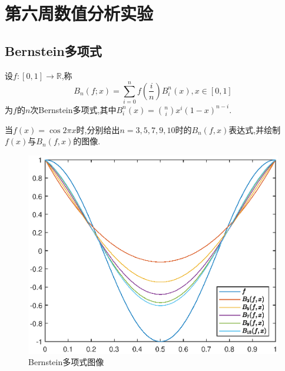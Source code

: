 \section{第六周数值分析实验}
\subsection{Bernstein多项式}
\begin{definition}
	设$f:[0,1]\to\mathbb{R}$,称
	$$
	B_n(f;x)=\sum_{i=0}^{n}f\left(\frac{i}{n}\right)B_i^n(x),x\in[0,1]
	$$
	为$f$的$n$次Bernstein多项式,其中$B_i^n(x)=\binom{n}{i}x^i(1-x)^{n-i}$.
\end{definition}

\begin{ex}
	当$f(x)=\cos 2\pi x$时,分别给出$n=3, 5, 7, 9, 10$时的$B_n(f,x)$表达式,并绘制$f(x)$与$B_n(f,x)$的图像.
\end{ex}

\begin{figure}[H]
	\centering
	\includegraphics[width = 0.6\linewidth]{day5/fig.eps}
	\caption{Bernstein多项式图像}
\end{figure}